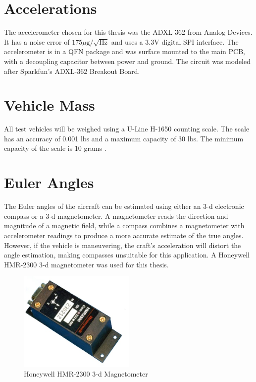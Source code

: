 \section{Accelerations}
The accelerometer chosen for this thesis was the ADXL-362 from Analog Devices. It has a noise error of $175\mu\text{g}/\sqrt{\text{Hz}}$ and uses a 3.3V digital SPI interface\cite{adxl362DataSheet}. The accelerometer is in a QFN package and was surface mounted to the main PCB, with a decoupling capacitor between power and ground. The circuit was modeled after Sparkfun's ADXL-362 Breakout Board\cite{Sparkfunadxl362BOB}.

\section{Vehicle Mass}
All test vehicles will be weighed using a U-Line H-1650 counting scale. The scale has an accuracy of 0.001 lbs and a maximum capacity of 30 lbs. The minimum capacity of the scale is 10 grams \cite{U-Line}.
\section{Euler Angles}
The Euler angles of the aircraft can be estimated using either an 3-d electronic compass or a 3-d magnetometer. A magnetometer reads the direction and magnitude of a magnetic field, while a compass combines a magnetometer with accelerometer readings to produce a more accurate estimate of the true angles. However, if the vehicle is maneuvering, the craft's acceleration will distort the angle estimation, making compasses unsuitable for this application. A Honeywell HMR-2300 3-d magnetometer was used for this thesis. 

\begin{figure}[H]
  \caption{Honeywell HMR-2300 3-d Magnetometer } \label{hmr23000Picture}
  \centering
    \includegraphics[width=0.5\textwidth]{figures/hmr2300.jpg}
\end{figure}

